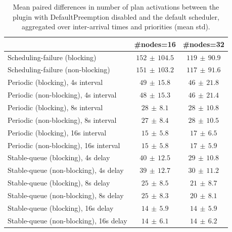 \begin{table}[t]
\tiny
\setlength{\tabcolsep}{1.2pt}
\renewcommand{\arraystretch}{1.12}
\centering
\caption{Mean paired differences in number of plan activations between the plugin with DefaultPreemption disabled and the default scheduler, aggregated over inter-arrival times and priorities (mean \pm std).}
\label{tab:plan_activations-defpreempt0-std1-agg-arrival-prio}
\begin{tabular}{l c c}
\toprule
 & \#nodes=16 & \#nodes=32 \\
\midrule
Scheduling-failure (blocking) & $152\,\pm\,104.5$ & $119\,\pm\,90.9$ \\
Scheduling-failure (non-blocking) & $151\,\pm\,103.2$ & $117\,\pm\,91.6$ \\
Periodic (blocking), 4s interval & $49\,\pm\,15.8$ & $46\,\pm\,21.8$ \\
Periodic (non-blocking), 4s interval & $48\,\pm\,15.3$ & $46\,\pm\,21.4$ \\
Periodic (blocking), 8s interval & $28\,\pm\,8.1$ & $28\,\pm\,10.8$ \\
Periodic (non-blocking), 8s interval & $27\,\pm\,8.4$ & $28\,\pm\,10.5$ \\
Periodic (blocking), 16s interval & $15\,\pm\,5.8$ & $17\,\pm\,6.5$ \\
Periodic (non-blocking), 16s interval & $15\,\pm\,5.8$ & $17\,\pm\,5.9$ \\
Stable-queue (blocking), 4s delay & $40\,\pm\,12.5$ & $29\,\pm\,10.8$ \\
Stable-queue (non-blocking), 4s delay & $39\,\pm\,12.7$ & $30\,\pm\,11.2$ \\
Stable-queue (blocking), 8s delay & $25\,\pm\,8.5$ & $21\,\pm\,8.7$ \\
Stable-queue (non-blocking), 8s delay & $25\,\pm\,8.3$ & $20\,\pm\,8.1$ \\
Stable-queue (blocking), 16s delay & $14\,\pm\,5.9$ & $14\,\pm\,5.9$ \\
Stable-queue (non-blocking), 16s delay & $14\,\pm\,6.1$ & $14\,\pm\,6.2$ \\
\bottomrule
\end{tabular}
\end{table}
